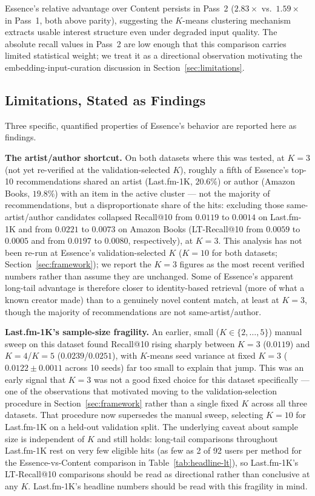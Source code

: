 \documentclass[11pt,a4paper]{article}
\begin{document}
Essence's relative advantage over Content persists in Pass~2
($2.83\times$ vs.\ $1.59\times$ in Pass~1, both above parity), suggesting the
$K$-means clustering mechanism extracts usable interest structure even
under degraded input quality. The absolute recall values in Pass~2 are low
enough that this comparison carries limited statistical weight; we treat
it as a directional observation motivating the embedding-input-curation
discussion in Section~\ref{sec:limitations}.

\subsection{Limitations, Stated as Findings}
\label{sec:limitations-findings}

Three specific, quantified properties of Essence's behavior are reported
here as findings.

\textbf{The artist/author shortcut.} On both datasets where this was
tested, at $K=3$ (not yet re-verified at the validation-selected $K$),
roughly a fifth of
Essence's top-10 recommendations shared an artist (Last.fm-1K, $20.6\%$)
or author (Amazon Books, $19.8\%$) with an item in the active cluster ---
not the majority of recommendations, but a disproportionate share of the
hits: excluding those same-artist/author candidates collapsed Recall@10
from $0.0119$ to $0.0014$ on Last.fm-1K and from $0.0221$ to $0.0073$ on
Amazon Books (LT-Recall@10 from $0.0059$ to $0.0005$ and from $0.0197$ to
$0.0080$, respectively), at $K=3$. This analysis has not been re-run at
Essence's validation-selected $K$ ($K=10$ for both datasets;
Section~\ref{sec:framework}); we report the $K=3$ figures as the most
recent verified numbers rather than assume they are unchanged. Some of
Essence's apparent long-tail advantage is therefore closer to
identity-based retrieval (more of what a known creator made) than to a
genuinely novel content match, at least at $K=3$, though the majority of
recommendations are not same-artist/author.

\textbf{Last.fm-1K's sample-size fragility.} An earlier, small ($K\in\{2,\ldots,5\}$)
manual sweep on this dataset found Recall@10 rising sharply between
$K=3$ ($0.0119$) and $K=4$/$K=5$ ($0.0239$/$0.0251$), with $K$-means seed
variance at fixed $K=3$ ($0.0122\pm0.0011$ across 10 seeds) far too small
to explain that jump. This was an early signal that $K=3$ was not a good
fixed choice for this dataset specifically --- one of the observations
that motivated moving to the validation-selection procedure in
Section~\ref{sec:framework} rather than a single fixed $K$ across all
three datasets. That procedure now supersedes the manual sweep,
selecting $K=10$ for Last.fm-1K on a held-out validation split. The
underlying caveat about sample size is independent of $K$ and still
holds: long-tail comparisons throughout Last.fm-1K rest on very few
eligible hits (as few as 2 of 92 users per method for the
Essence-vs-Content comparison in Table~\ref{tab:headline-lt}), so
Last.fm-1K's LT-Recall@10 comparisons should be read as directional
rather than conclusive at any $K$.
Last.fm-1K's headline numbers should be read with this fragility in mind.
\end{document}
